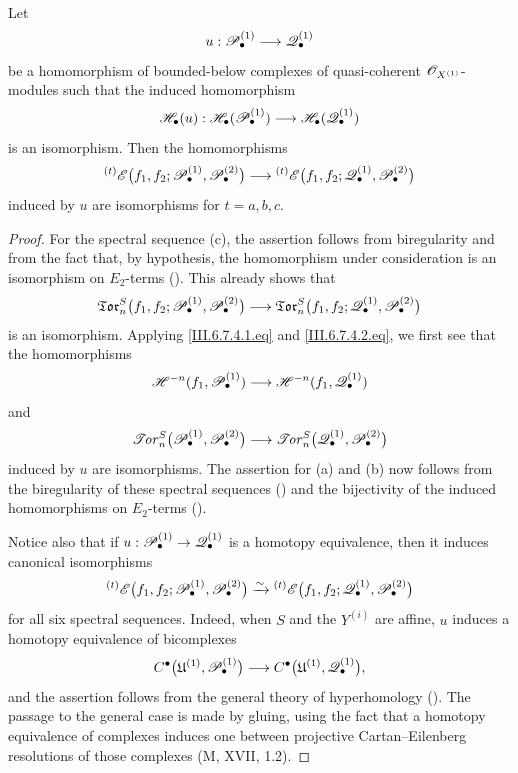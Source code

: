 \begin{proposition}[6.7.5]
\label{III.6.7.5}
Let
\[
  u:\mathscr{P}_\bullet^{(1)}
  \longrightarrow
  \mathscr{Q}_\bullet^{(1)}
\]
be a homomorphism of bounded-below complexes of quasi-coherent
$\mathscr{O}_{X^{(1)}}$-modules such that the induced homomorphism
\[
  \mathscr{H}_\bullet(u):
  \mathscr{H}_\bullet(\mathscr{P}_\bullet^{(1)})
  \longrightarrow
  \mathscr{H}_\bullet(\mathscr{Q}_\bullet^{(1)})
\]
is an isomorphism.  Then the homomorphisms
\[
  {}^{(t)}\mathscr{E}
  \bigl(
    f_1,f_2;
    \mathscr{P}_\bullet^{(1)},\mathscr{P}_\bullet^{(2)}
  \bigr)
  \longrightarrow
  {}^{(t)}\mathscr{E}
  \bigl(
    f_1,f_2;
    \mathscr{Q}_\bullet^{(1)},\mathscr{P}_\bullet^{(2)}
  \bigr)
\]
induced by $u$ are isomorphisms for $t=a,b,c$.
\end{proposition}

\begin{proof}
For the spectral sequence \textnormal{(c)}, the assertion follows
from biregularity and from the fact that, by hypothesis, the
homomorphism under consideration is an isomorphism on
$E_2$-terms ().  This already shows that
\[
\begin{split}
  \mathfrak{Tor}_n^S
  \bigl(
    f_1,f_2;
    \mathscr{P}_\bullet^{(1)},\mathscr{P}_\bullet^{(2)}
  \bigr)
  \longrightarrow
  \mathfrak{Tor}_n^S
  \bigl(
    f_1,f_2;
    \mathscr{Q}_\bullet^{(1)},\mathscr{P}_\bullet^{(2)}
  \bigr)
\end{split}
\]
is an isomorphism.  Applying \eqref{III.6.7.4.1.eq} and
\eqref{III.6.7.4.2.eq}, we first see that the homomorphisms
\[
  \mathscr{H}^{-n}(f_1,\mathscr{P}_\bullet^{(1)})
  \longrightarrow
  \mathscr{H}^{-n}(f_1,\mathscr{Q}_\bullet^{(1)})
\]
and
\[
  \mathscr{T}\!\mathit{or}_n^S
  \bigl(
    \mathscr{P}_\bullet^{(1)},\mathscr{P}_\bullet^{(2)}
  \bigr)
  \longrightarrow
  \mathscr{T}\!\mathit{or}_n^S
  \bigl(
    \mathscr{Q}_\bullet^{(1)},\mathscr{P}_\bullet^{(2)}
  \bigr)
\]
induced by $u$ are isomorphisms.  The assertion for
\textnormal{(a)} and \textnormal{(b)} now follows from the
biregularity of these spectral sequences
() and the bijectivity of the induced
homomorphisms on $E_2$-terms ().

Notice also that if
$u:\mathscr{P}_\bullet^{(1)}\to\mathscr{Q}_\bullet^{(1)}$ is a homotopy
equivalence, then it induces canonical isomorphisms
\[
  {}^{(t)}\mathscr{E}
  \bigl(
    f_1,f_2;
    \mathscr{P}_\bullet^{(1)},\mathscr{P}_\bullet^{(2)}
  \bigr)
  \xrightarrow{\sim}
  {}^{(t)}\mathscr{E}
  \bigl(
    f_1,f_2;
    \mathscr{Q}_\bullet^{(1)},\mathscr{P}_\bullet^{(2)}
  \bigr)
\]
for all six spectral sequences.  Indeed, when $S$ and the
$Y^{(i)}$ are affine, $u$ induces a homotopy equivalence of
bicomplexes
\[
  C^\bullet
  \bigl(
    \mathfrak U^{(1)},\mathscr{P}_\bullet^{(1)}
  \bigr)
  \longrightarrow
  C^\bullet
  \bigl(
    \mathfrak U^{(1)},\mathscr{Q}_\bullet^{(1)}
  \bigr),
\]
and the assertion follows from the general theory of
hyperhomology ().  The passage to the general
case is made by gluing, using the fact that a homotopy
equivalence of complexes induces one between projective
Cartan--Eilenberg resolutions of those complexes
(\textnormal{M}, XVII, 1.2).
\end{proof}


